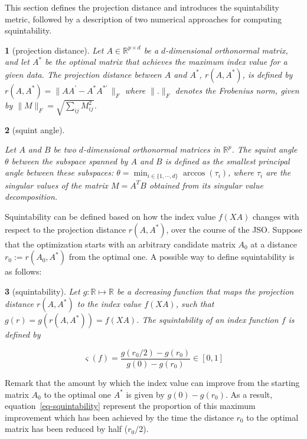 \documentclass[
  12pt,
]{interact}
\theoremstyle{plain}
\newtheorem{defn}{\protect\definitionname}
\providecommand{\definitionname}{Definition}
\begin{document}
This section defines the projection distance and introduces the
squintability metric, followed by a description of two numerical
approaches for computing squintability.

\begin{defn}[projection distance]\label{def:proj-dist}
Let $A \in \mathbb{R}^{p \times d}$ be a $d$-dimensional orthonormal matrix, and let $A^*$ be the optimal matrix that achieves the maximum index value for a given data. The projection distance between $A$ 
and $A^*$, $r(A, A^*)$, is defined by
$r(A, A^*) = \lVert AA^\prime - A^*A^{*\prime}\,\rVert _F$
where $\lVert . \rVert _F$ denotes the Frobenius norm, given by
$\lVert M \rVert _F = \sqrt{\sum_{ij} M_{ij}^2}$. 
\end{defn}
\begin{defn}[squint angle]\label{def:squint-angle}
 
Let $A$ and $B$ be two $d$-dimensional orthonormal matrices in $\mathbb{R}^p$. The squint angle $\theta$ between the subspace spanned by $A$ and $B$ is defined as the smallest principal angle between these subspaces: $\theta = \min_{i \in \{1, \cdots, d\}} \arccos(\tau_i)$, where $\tau_i$ are the singular values of the matrix $M = A^T B$ obtained from its singular value decomposition.
\end{defn}

Squintability can be defined based on how the index value \(f(XA)\)
changes with respect to the projection distance \(r(A, A^*)\), over the
course of the JSO. Suppose that the optimization starts with an
arbitrary candidate matrix \(A_0\) at a distance \(r_0:=r(A_0, A^*)\)
from the optimal one. A possible way to define squintability is as
follows:

\begin{defn}[squintability]\label{def:squintability}
Let $g: \mathbb{R} \mapsto  \mathbb{R}$ be a decreasing function that maps the projection distance $r(A, A^*)$ to the index value $f(XA)$, such that $g(r) = g(r(A, A^*)) = f(XA)$.  The squintability of an index function $f$ is defined by 

\begin{equation}
\varsigma(f) = \frac{g(r_{0}/2)-g(r_{0})}{g(0)-g(r_{0})} \in [0,1]
\label{eq-squintability}
\end{equation}

\end{defn}

Remark that the amount by which the index value can improve from the
starting matrix \(A_0\) to the optimal one \(A^*\) is given by
\(g(0)-g(r_{0})\). As a result, equation~\eqref{eq-squintability}
represent the proportion of this maximum improvement which has been
achieved by the time the distance \(r_0\) to the optimal matrix has been
reduced by half (\(r_0/2\)).
\end{document}
